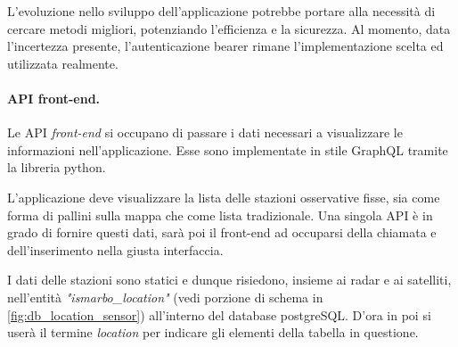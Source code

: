 \documentclass[./main.tex]{subfiles}
\begin{document}
L'evoluzione nello sviluppo dell'applicazione potrebbe portare alla necessità di cercare metodi migliori, potenziando l'efficienza e la sicurezza. Al momento, data l'incertezza presente, l'autenticazione bearer rimane l'implementazione scelta ed utilizzata realmente.\par



\paragraph{API front-end.}
Le API \textit{front-end} si occupano di passare i dati necessari a visualizzare le informazioni nell'applicazione. Esse sono implementate in stile GraphQL tramite la libreria python.\par

L'applicazione deve visualizzare la lista delle stazioni osservative fisse, sia come forma di pallini sulla mappa che come lista tradizionale. Una singola API è in grado di fornire questi dati, sarà poi il front-end ad occuparsi della chiamata e dell'inserimento nella giusta interfaccia.\par

I dati delle stazioni sono statici e dunque risiedono, insieme ai radar e ai satelliti, nell'entità \textit{"ismarbo\_location"} (vedi porzione di schema in \autoref{fig:db_location_sensor}) all'interno del database postgreSQL. D'ora in poi si userà il termine \textit{location} per indicare gli elementi della tabella in questione.
\end{document}
